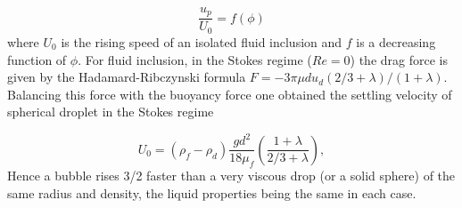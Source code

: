 


\begin{equation}
\frac{u_p}{U_0} = f(\phi)
\end{equation}
where $U_0$ is the rising speed of an isolated fluid inclusion and $f$ is a decreasing function of $\phi$. For fluid inclusion, in the Stokes regime ($Re=0$) the drag force is given by the Hadamard-Ribczynski formula $ F = -3\pi \mu d u_d (2/3+\lambda)/(1+\lambda)$. %
Balancing this force with the buoyancy force one obtained the settling velocity of  spherical droplet in the Stokes regime



\begin{equation}
    U_0
    = (\rho_f - \rho_d)\frac{g d^2}{18\mu_f}\left(\frac{1+\lambda}{2/3 + \lambda}\right),
    \label{eq:u_o}
\end{equation}
Hence a bubble rises 3/2 faster than a very viscous drop (or a solid sphere) of the same radius and density, the liquid properties being the same in each case.

